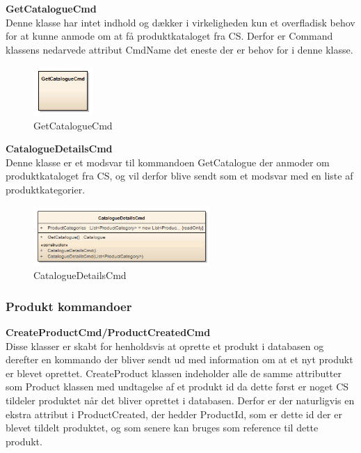 \textbf{GetCatalogueCmd}\\
Denne klasse har intet indhold og dækker i virkeligheden kun et overfladisk behov for at kunne anmode om at få produktkataloget fra \gls{CS}. Derfor er Command klassens nedarvede attribut CmdName det eneste der er behov for i denne klasse.

\begin{figure}[H]
    \centering
    \includegraphics[width=0.2\textwidth]{Systemdesign/SharedLib/Images/Klasser/Command/GetCatalogue.png}
    \caption{GetCatalogueCmd}
    \label{fig:klasseCMDGetC}
\end{figure}

\textbf{CatalogueDetailsCmd}\\
Denne klasse er et modsvar til kommandoen GetCatalogue der anmoder om produktkataloget fra \gls{CS}, og vil derfor blive sendt som et modsvar med en liste af produktkategorier.

\begin{figure}[H]
    \centering
    \includegraphics[width=0.6\textwidth]{Systemdesign/SharedLib/Images/Klasser/Command/CatalogueDetails.png}
    \caption{CatalogueDetailsCmd}
    \label{fig:klasseCMDGetC}
\end{figure}

\subsubsection*{Produkt kommandoer}

\textbf{CreateProductCmd/ProductCreatedCmd}\\
Disse klasser er skabt for henholdsvis at oprette et produkt i databasen og derefter en kommando der bliver sendt ud med information om at et nyt produkt er blevet oprettet. CreateProduct klassen indeholder alle de samme attributter som Product klassen med undtagelse af et produkt id da dette først er noget \gls{CS} tildeler produktet når det bliver oprettet i databasen. Derfor er der naturligvis en ekstra attribut i ProductCreated, der hedder ProductId, som er dette id der er blevet tildelt produktet, og som senere kan bruges som reference til dette produkt.

